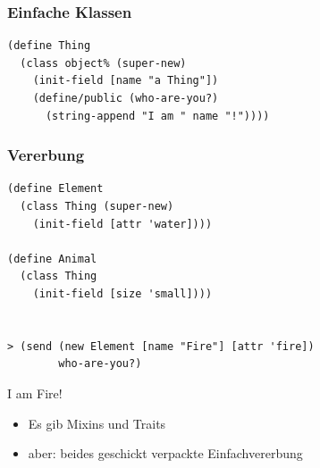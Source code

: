 \documentclass{beamer}
\newcommand{\routput}{\vspace{-0.25cm}\hspace{5pt}\footnotesize\color{blue}\ttfamily}
\newcommand{\qq}{\textquotedbl}
\begin{document}
\begin{frame}[fragile]
 \frametitle{Einfache Klassen}
 \begin{lstlisting}
(define Thing 
  (class object% (super-new)
    (init-field [name "a Thing"])
    (define/public (who-are-you?) 
      (string-append "I am " name "!"))))
 \end{lstlisting}
\end{frame}

\begin{frame}[fragile]
 \frametitle{Vererbung}
 \begin{lstlisting}
(define Element 
  (class Thing (super-new)
    (init-field [attr 'water])))
    
(define Animal 
  (class Thing
    (init-field [size 'small])))
    
    
> (send (new Element [name "Fire"] [attr 'fire]) 
        who-are-you?)
\end{lstlisting} \vspace{0.6cm}
{\routput {\qq}I am Fire!\qq}\\
\vspace{0.5cm}
\begin{itemize}
 \item Es gib Mixins und Traits
 \item aber: beides geschickt verpackte Einfachvererbung
\end{itemize}
\end{frame}
\end{document}
